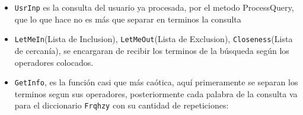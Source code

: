 \begin{enumerate}
\begin{itemize}
    \begin{itemize}
    \tightlist
    \item
      \texttt{UsrInp} es la consulta del usuario ya procesada, por el
      metodo ProcessQuery, que lo que hace no es más que separar en
      terminos la consulta
    \item
      \texttt{LetMeIn}(Lista de Inclusion), \texttt{LetMeOut}(Lista de
      Exclusion), \texttt{Closeness}(Lista de cercanía), se encargaran
      de recibir los terminos de la búsqueda según los operadores
      colocados.
    \item
      \texttt{GetInfo}, es la función casi que más caótica, aquí
      primeramente se separan los terminos segun sus operadores,
      posteriormente cada palabra de la consulta va para el diccionario
      \texttt{Frqhzy} con su cantidad de repeticiones:
    \end{itemize}
  \end{itemize}

\begin{Shaded}
\begin{Highlighting}[]
 \OperatorTok{(!}\OperatorTok{(}\OperatorTok{[}\OperatorTok{]))\{}
\OperatorTok{(}\OperatorTok{[}\OperatorTok{],} \OperatorTok{);}
        \OperatorTok{\}}
\OperatorTok{[}\OperatorTok{[}\OperatorTok{]]} \OperatorTok{+=}\OperatorTok{+} \OperatorTok{;}
         \OperatorTok{(}\OperatorTok{\textless{}}\OperatorTok{[}\OperatorTok{[}\OperatorTok{]])\{}
\OperatorTok{=}\OperatorTok{[}\OperatorTok{[}\OperatorTok{]];}
        \OperatorTok{\}}
    \OperatorTok{\}}
\OperatorTok{=}  \OperatorTok{[}\OperatorTok{];}
     \OperatorTok{(}\OperatorTok{)}
    \OperatorTok{\{}
\OperatorTok{[}\OperatorTok{]} \OperatorTok{=}\OperatorTok{;}
\OperatorTok{++;}
    \OperatorTok{\}}
\end{Highlighting}
\end{Shaded}


\end{enumerate}
